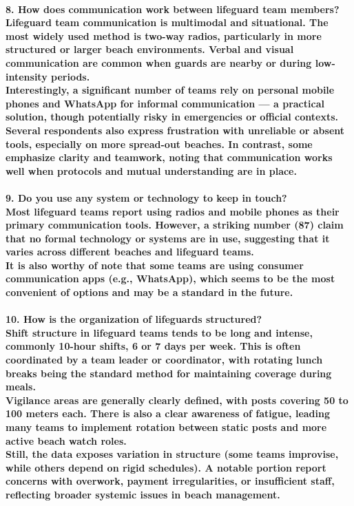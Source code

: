\paragraph{
\textbf{8. How does communication work between lifeguard team members?}
\\
Lifeguard team communication is multimodal and situational. The most widely used method is two-way radios, particularly in more structured or larger beach environments. Verbal and visual communication are common when guards are nearby or during low-intensity periods.
\\
Interestingly, a significant number of teams rely on personal mobile phones and WhatsApp for informal communication — a practical solution, though potentially risky in emergencies or official contexts.
\\
Several respondents also express frustration with unreliable or absent tools, especially on more spread-out beaches. In contrast, some emphasize clarity and teamwork, noting that communication works well when protocols and mutual understanding are in place.}

\paragraph{
\textbf{9. Do you use any system or technology to keep in touch?}
\\
Most lifeguard teams report using radios and mobile phones as their primary communication tools. However, a striking number (87) claim that no formal technology or systems are in use, suggesting that it varies across different beaches and lifeguard teams.
\\
It is also worthy of note that some teams are using consumer communication apps (e.g., WhatsApp), which seems to be the most convenient of options and may be a standard in the future.}

\paragraph{
\textbf{10. How is the organization of lifeguards structured?}
\\
Shift structure in lifeguard teams tends to be long and intense, commonly 10-hour shifts, 6 or 7 days per week. This is often coordinated by a team leader or coordinator, with rotating lunch breaks being the standard method for maintaining coverage during meals.
\\
Vigilance areas are generally clearly defined, with posts covering 50 to 100 meters each. There is also a clear awareness of fatigue, leading many teams to implement rotation between static posts and more active beach watch roles.
\\
Still, the data exposes variation in structure (some teams improvise, while others depend on rigid schedules). A notable portion report concerns with overwork, payment irregularities, or insufficient staff, reflecting broader systemic issues in beach management.}

